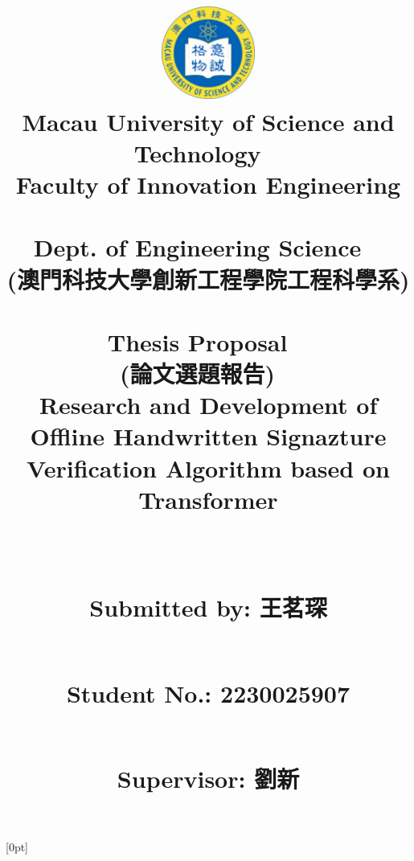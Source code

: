 \documentclass{article}
\begin{document}
\title{\includegraphics[width=1.2in]{MUST.png}\\[-2pt]\huge Macau University of Science and Technology
~\\
Faculty of Innovation Engineering
~\\
Dept. of Engineering Science
~\\
\LARGE{(澳門科技大學創新工程學院工程科學系)}
~\\[40pt]

Thesis Proposal 
~\\
(論文選題報告)
~\\[40pt]

\textbf{\LARGE Research and Development of Offline Handwritten Signazture Verification Algorithm based on Transformer}

\title{}

~\\[50pt]





\large{

 Submitted by: 王茗琛


~\\[1pt]

 Student No.: 2230025907

~\\[1pt]

 Supervisor: 劉新} 
 
     } 

\author{}

\date{}


[0pt]{\addvspace{5pt}\filright}              
{\contentspush{\thecontentslabel\ 
}}              
{}{\contentspage}


\maketitle
\thispagestyle{empty}

\clearpage
\end{document}
